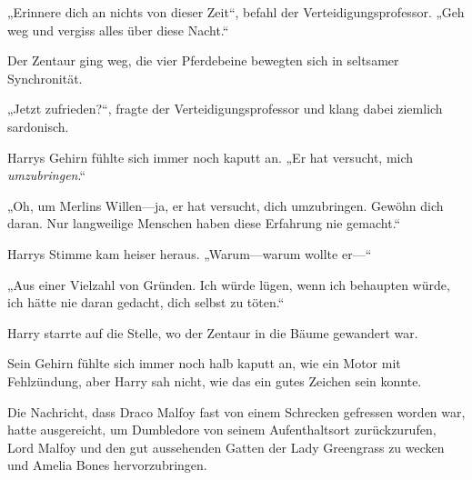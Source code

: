 „Erinnere dich an nichts von dieser Zeit“, befahl der Verteidigungsprofessor.
„Geh weg und vergiss alles über diese Nacht.“

Der Zentaur ging weg, die vier Pferdebeine bewegten sich in seltsamer Synchronität.

„Jetzt zufrieden?“, fragte der Verteidigungsprofessor und klang dabei ziemlich sardonisch.

Harrys Gehirn fühlte sich immer noch kaputt an.
„Er hat versucht, mich \emph{umzubringen}.“

„Oh, um Merlins Willen—ja, er hat versucht, dich umzubringen. Gewöhn dich daran. Nur langweilige Menschen haben diese Erfahrung nie gemacht.“

Harrys Stimme kam heiser heraus. „Warum—warum wollte er—“

„Aus einer Vielzahl von Gründen. Ich würde lügen, wenn ich behaupten würde, ich hätte nie daran gedacht, dich selbst zu töten.“

Harry starrte auf die Stelle, wo der Zentaur in die Bäume gewandert war.

Sein Gehirn fühlte sich immer noch halb kaputt an, wie ein Motor mit Fehlzündung, aber Harry sah nicht, wie das ein gutes Zeichen sein konnte.

\later

Die Nachricht, dass Draco Malfoy fast von einem Schrecken gefressen worden war, hatte ausgereicht, um Dumbledore von seinem Aufenthaltsort zurückzurufen, Lord Malfoy und den gut aussehenden Gatten der Lady Greengrass zu wecken und Amelia Bones hervorzubringen.

